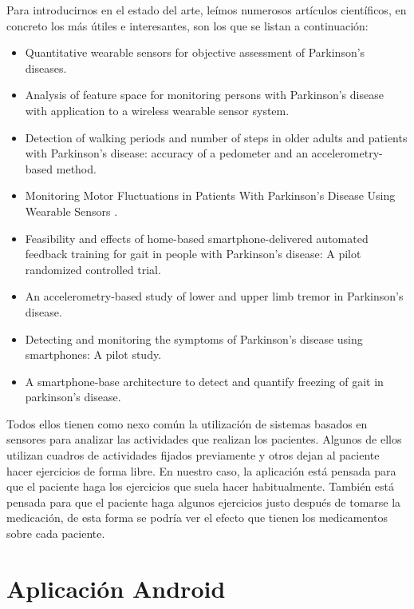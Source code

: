 \documentclass[11pt,spanish]{article}
\begin{document}
Para introducirnos en el estado del arte, leímos numerosos artículos científicos, en concreto los más útiles e interesantes, son los que se listan a continuación:
\newline

\begin{itemize}
	\item Quantitative wearable sensors for objective assessment of Parkinson’s diseases.
	\item Analysis of feature space for monitoring persons with Parkinson’s disease with application to a wireless wearable sensor system. 
	\item Detection of walking periods and number of steps in older adults and patients with Parkinson’s disease: accuracy of a pedometer and an accelerometry-based method. 
	\item Monitoring Motor Fluctuations in Patients With Parkinson’s Disease Using Wearable Sensors . 
	\item Feasibility and effects of home-based smartphone-delivered automated feedback training for gait in people with Parkinson’s disease: A pilot randomized controlled trial.
	\item An accelerometry-based study of lower and upper limb tremor in Parkinson’s disease. 
	\item Detecting and monitoring the symptoms of Parkinson’s disease using smartphones: A pilot study.
	\item A smartphone-base architecture to detect and quantify freezing of gait in parkinson’s disease.
    \newline
\end{itemize}

Todos ellos tienen como nexo común la utilización de sistemas basados en sensores para analizar las actividades que realizan los pacientes. Algunos de ellos utilizan cuadros de actividades fijados previamente y otros dejan al paciente hacer ejercicios de forma libre. En nuestro caso, la aplicación está pensada para que el paciente haga los ejercicios que suela hacer habitualmente. También está pensada para que el paciente haga algunos ejercicios justo después de tomarse la medicación, de esta forma se podría ver el efecto que tienen los medicamentos sobre cada paciente.
\newpage

\section*{Aplicación Android}
\end{document}
